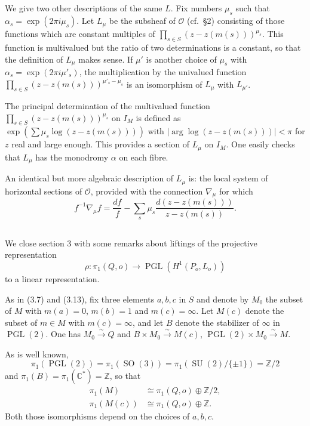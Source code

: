 \documentclass[12pt,a4paper]{article}
\theoremstyle{plain}
\theoremstyle{definition}
\theoremstyle{remark}
\DeclareMathOperator{\PGL}{PGL}
\newcommand{\CC}{\mathbb{C}}
\newcommand{\ZZ}{\mathbb{Z}}
\numberwithin{equation}{section}
\providecommand{\CC}{\mathbb{C}}
\providecommand{\ZZ}{\mathbb{Z}}
\providecommand{\PGL}{\operatorname{PGL}}
\providecommand{\SO}{\operatorname{SO}}
\providecommand{\SU}{\operatorname{SU}}
\begin{document}
\subsection{}
We give two other descriptions of the same $L$. Fix numbers $\mu_s$ such that $\alpha_s = \exp(2\pi i \mu_s)$. Let $L_\mu$ be the subsheaf of $\mathcal{O}$ (cf.\ \S 2) consisting of those functions which are constant multiples of $\prod_{s \in S} (z - z(m(s)))^{\mu_s}$. This function is multivalued but the ratio of two determinations is a constant, so that the definition of $L_\mu$ makes sense. If $\mu'$ is another choice of $\mu_s$ with $\alpha_s = \exp(2\pi i \mu'_s)$, the multiplication by the univalued function $\prod_{s \in S} (z - z(m(s)))^{\mu'_s - \mu_s}$ is an isomorphism of $L_\mu$ with $L_{\mu'}$.

The principal determination of the multivalued function $\prod_{s \in S} (z - z(m(s)))^{\mu_s}$ on $I_M$ is defined as $\exp(\sum \mu_s \log(z - z(m(s))))$ with $|\arg \log(z - z(m(s)))| < \pi$ for $z$ real and large enough. This provides a section of $L_\mu$ on $I_M$. One easily checks that $L_\mu$ has the monodromy $\alpha$ on each fibre.

An identical but more algebraic description of $L_\mu$ is: the local system of horizontal sections of $\mathcal{O}$, provided with the connection $\nabla_\mu$ for which
\[
f^{-1}\nabla_\mu f = \frac{df}{f} - \sum_s \mu_s \frac{d(z - z(m(s)))}{z - z(m(s))}.
\]

\subsection{}
We close section 3 with some remarks about liftings of the projective representation
\[
\rho: \pi_1(Q, o) \to \PGL(H^1(P_o, L_o))
\]
to a linear representation.

As in (3.7) and (3.13), fix three elements $a, b, c$ in $S$ and denote by $M_0$ the subset of $M$ with $m(a) = 0$, $m(b) = 1$ and $m(c) = \infty$. Let $M(c)$ denote the subset of $m \in M$ with $m(c) = \infty$, and let $B$ denote the stabilizer of $\infty$ in $\PGL(2)$. One has $M_0 \xrightarrow{\sim} Q$ and $B \times M_0 \xrightarrow{\sim} M(c)$, $\PGL(2) \times M_0 \xrightarrow{\sim} M$.

As is well known,
\[
\pi_1(\PGL(2)) = \pi_1(\SO(3)) = \pi_1(\SU(2)/\{\pm 1\}) = \ZZ/2
\]
and $\pi_1(B) = \pi_1(\CC^*) = \ZZ$, so that
\begin{align}
\pi_1(M) &\cong \pi_1(Q, o) \oplus \ZZ/2, \label{eq:3.15.1} \\
\pi_1(M(c)) &\cong \pi_1(Q, o) \oplus \ZZ. \label{eq:3.15.2}
\end{align}
Both those isomorphisms depend on the choices of $a, b, c$.
\end{document}

